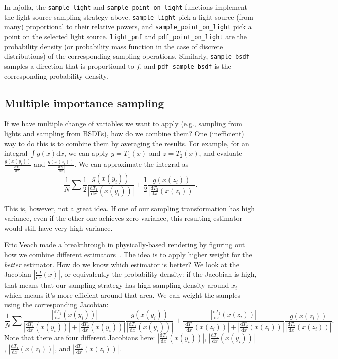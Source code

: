 \documentclass{article}
\begin{document}
In lajolla, the \lstinline{sample_light} and \lstinline{sample_point_on_light} functions implement the light source sampling strategy above. \lstinline{sample_light} pick a light source (from many) proportional to their relative powers, and \lstinline{sample_point_on_light} pick a point on the selected light source. \lstinline{light_pmf} and \lstinline{pdf_point_on_light} are the probability density (or probability mass function in the case of discrete distributions) of the corresponding sampling operations. Similarly, \lstinline{sample_bsdf} samples a direction that is proportional to $f$, and \lstinline{pdf_sample_bsdf} is the corresponding probability density.

\subsection{Multiple importance sampling}

If we have multiple change of variables we want to apply (e.g., sampling from lights and sampling from BSDFs), how do we combine them? One (inefficient) way to do this is to combine them by averaging the results. For example, for an integral $\int g(x) \mathrm{d}x$, we can apply $y = T_1(x)$ and $z = T_2(x)$, and evaluate $\frac{g(x(y_i))}{
\frac{\mathrm{d}T_1}{\mathrm{d}x}|}$ and $\frac{g(x(z_i))}{|\frac{\mathrm{d}T_2}{\mathrm{d}x}|}$. We can approximate the integral as
\begin{equation}
\frac{1}{N} \sum
\frac{1}{2} \frac{g(x(y_i))}{|\frac{\mathrm{d}T_1}{\mathrm{d}x}(x(y_i))|} + 
\frac{1}{2} \frac{g(x(z_i))}{|\frac{\mathrm{d}T_2}{\mathrm{d}x}(x(z_i))|}.
\end{equation}

This is, however, not a great idea. If one of our sampling transformation has high variance, even if the other one achieves zero variance, this resulting estimator would still have very high variance.

Eric Veach made a breakthrough in physically-based rendering by figuring out how we combine different estimators~\cite{Veach:1995:OCS}. The idea is to apply higher weight for the \emph{better} estimator. How do we know which estimator is better? We look at the Jacobian $|\frac{\mathrm{d}T}{\mathrm{d}x}(x)|$, or equivalently the probability density: if the Jacobian is high, that means that our sampling strategy has high sampling density around $x_i$ -- which means it's more efficient around that area. We can weight the samples using the corresponding Jacobian:
\begin{equation}
\frac{1}{N} \sum
\frac{|\frac{\mathrm{d}T_1}{\mathrm{d}x}(x(y_i))|}{|\frac{\mathrm{d}T_1}{\mathrm{d}x}(x(y_i))| + |\frac{\mathrm{d}T_2}{\mathrm{d}x}(x(y_i))|}
\frac{g(x(y_i))}{|\frac{\mathrm{d}T_1}{\mathrm{d}x}(x(y_i))|} + 
\frac{|\frac{\mathrm{d}T_2}{\mathrm{d}x}(x(z_i))|}{|\frac{\mathrm{d}T_1}{\mathrm{d}x}(x(z_i))| + |\frac{\mathrm{d}T_2}{\mathrm{d}x}(x(z_i))|}
\frac{g(x(z_i))}{|\frac{\mathrm{d}T_2}{\mathrm{d}x}(x(z_i))|}.
\end{equation}
Note that there are four different Jacobians here: $|\frac{\mathrm{d}T_1}{\mathrm{d}x}(x(y_i))|$, $|\frac{\mathrm{d}T_2}{\mathrm{d}x}(x(y_i))|$, $|\frac{\mathrm{d}T_1}{\mathrm{d}x}(x(z_i))|$, and $|\frac{\mathrm{d}T_2}{\mathrm{d}x}(x(z_i))|$.
\end{document}
